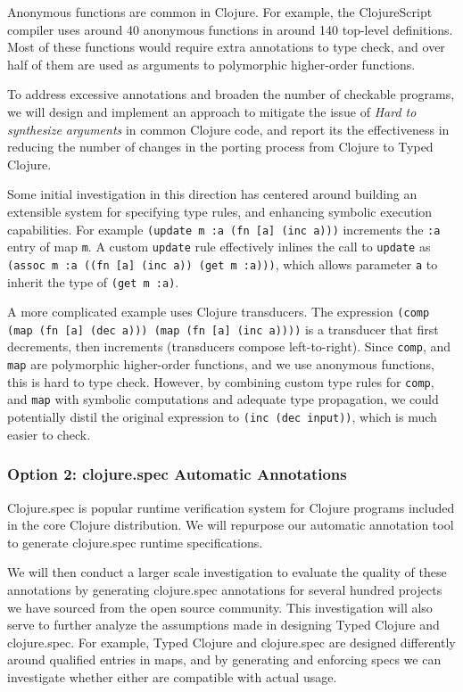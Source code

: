 \documentclass[9pt]{extarticle}
\begin{document}
Anonymous functions are common in Clojure. For example, the ClojureScript compiler
uses around 40 anonymous functions in around 140 top-level definitions.
Most of these functions would require extra annotations to type check, and
over half of them are used as arguments to polymorphic higher-order functions.

To address excessive annotations and broaden the number of checkable programs,
we will design and implement an approach to mitigate the issue of \emph{Hard
to synthesize arguments} in common Clojure code, and report its the effectiveness
in reducing the number of changes in the porting process from Clojure to
Typed Clojure.

Some initial investigation in this direction has centered around building
an extensible system for specifying type rules, and enhancing symbolic
execution capabilities. For example
%
\texttt{(update m :a (fn [a] (inc a)))}
%
increments the \texttt{:a}
entry of map \texttt{m}. A custom \texttt{update} rule
effectively inlines the call to \texttt{update} as \texttt{(assoc m :a ((fn [a] (inc a)) (get m :a)))},
which allows parameter \texttt{a} to inherit the type of \texttt{(get m :a)}.

A more complicated example uses Clojure transducers. The expression 
\texttt{(comp (map (fn [a] (dec a))) (map (fn [a] (inc a))))} is a transducer that first
decrements, then increments (transducers compose left-to-right).
Since \texttt{comp}, and \texttt{map} are polymorphic higher-order
functions, and we use anonymous functions, this is hard to type check.
However, by combining custom type rules for \texttt{comp}, and \texttt{map}
with symbolic computations and adequate type propagation, we could potentially distil the original expression to
\texttt{(inc (dec input))}, which is much easier to check.

\subsubsection{Option 2: clojure.spec Automatic Annotations}

Clojure.spec is popular runtime verification system for Clojure programs included
in the core Clojure distribution.
We will repurpose our automatic annotation
tool to generate clojure.spec runtime specifications.

We will then conduct a larger scale investigation to evaluate the quality 
of these annotations by generating clojure.spec annotations for several hundred
projects we have sourced from the open source community.
This investigation will also serve to further analyze the assumptions made 
in designing Typed Clojure and clojure.spec.
For example, Typed Clojure and clojure.spec are designed differently
around qualified entries in maps, and by generating and enforcing specs
we can investigate whether either are compatible with actual usage.
\end{document}
